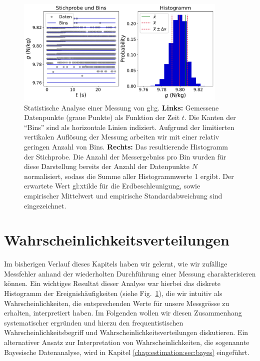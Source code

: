 \begin{figure}[H]
\centering
\includegraphics[width=0.9\textwidth]{Figures/messfehler1.pdf}
\caption{Statistische Analyse einer Messung von \gls{gl:g}. \textbf{Links:} Gemessene Datenpunkte (graue Punkte) als Funktion der Zeit $t$. Die Kanten der ``Bins'' sind als horizontale Linien indiziert. Aufgrund der limitierten vertikalen Auflösung der Messung arbeiten wir mit einer relativ geringen Anzahl von Bins.  \textbf{Rechts:} Das resultierende Histogramm der Stichprobe. Die Anzahl der Messergebniss pro Bin wurden für diese Darstellung bereits der Anzahl der Datenpunkte $N$ normalisiert, sodass die Summe aller Histogrammwerte 1 ergibt. Der erwartete Wert \gls{gl:xtilde} für die Erdbeschleunigung, sowie empirischer Mittelwert und empirische Standardabweichung sind eingezeichnet. }
\label{fig:messfehler1}
\end{figure}

\section{Wahrscheinlichkeitsverteilungen}
\label{chap:fehler:sec:frequentistisch}

Im bisherigen Verlauf dieses Kapitels haben wir gelernt, wie wir zufällige Messfehler anhand der wiederholten Durchführung einer Messung charakterisieren können. Ein wichtiges Resultat dieser Analyse war hierbei das diskrete Histogramm der Ereignishäufigkeiten (siehe Fig.~\ref{fig:messfehler1}), die wir intuitiv als Wahrscheinlichkeiten, die entsprechenden Werte für unsere Messgrösse zu erhalten, interpretiert haben.  Im Folgenden wollen wir diesen Zusammenhang systematischer ergründen und hierzu den frequentistischen Wahrscheinlichkeitsbegriff und Wahrscheinlichkeitsverteilungen diskutieren.  Ein alternativer Ansatz zur Interpretation von Wahrscheinlichkeiten, die sogenannte Bayesische Datenanalyse, wird in Kapitel \ref{chap:estimation:sec:bayes} eingeführt. 

